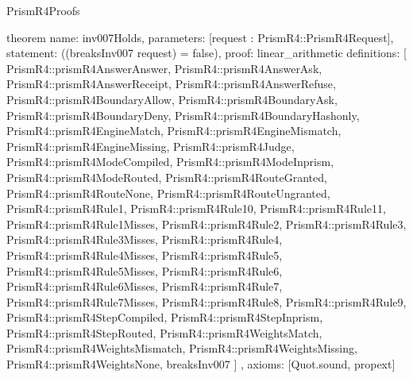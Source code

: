 \begin{lexlean}{PrismR4Proofs}
\begin{semanticmodule}
theorem{
  name: inv007Holds,
  parameters: [request : PrismR4::PrismR4Request],
  statement: ((breaksInv007 request) = false),
  proof: linear_arithmetic{
    definitions: [
      PrismR4::prismR4AnswerAnswer,
      PrismR4::prismR4AnswerAsk,
      PrismR4::prismR4AnswerReceipt,
      PrismR4::prismR4AnswerRefuse,
      PrismR4::prismR4BoundaryAllow,
      PrismR4::prismR4BoundaryAsk,
      PrismR4::prismR4BoundaryDeny,
      PrismR4::prismR4BoundaryHashonly,
      PrismR4::prismR4EngineMatch,
      PrismR4::prismR4EngineMismatch,
      PrismR4::prismR4EngineMissing,
      PrismR4::prismR4Judge,
      PrismR4::prismR4ModeCompiled,
      PrismR4::prismR4ModeInprism,
      PrismR4::prismR4ModeRouted,
      PrismR4::prismR4RouteGranted,
      PrismR4::prismR4RouteNone,
      PrismR4::prismR4RouteUngranted,
      PrismR4::prismR4Rule1,
      PrismR4::prismR4Rule10,
      PrismR4::prismR4Rule11,
      PrismR4::prismR4Rule1Misses,
      PrismR4::prismR4Rule2,
      PrismR4::prismR4Rule3,
      PrismR4::prismR4Rule3Misses,
      PrismR4::prismR4Rule4,
      PrismR4::prismR4Rule4Misses,
      PrismR4::prismR4Rule5,
      PrismR4::prismR4Rule5Misses,
      PrismR4::prismR4Rule6,
      PrismR4::prismR4Rule6Misses,
      PrismR4::prismR4Rule7,
      PrismR4::prismR4Rule7Misses,
      PrismR4::prismR4Rule8,
      PrismR4::prismR4Rule9,
      PrismR4::prismR4StepCompiled,
      PrismR4::prismR4StepInprism,
      PrismR4::prismR4StepRouted,
      PrismR4::prismR4WeightsMatch,
      PrismR4::prismR4WeightsMismatch,
      PrismR4::prismR4WeightsMissing,
      PrismR4::prismR4WeightsNone,
      breaksInv007
    ]
  },
  axioms: [Quot.sound, propext]
}
\end{semanticmodule}
\end{lexlean}
